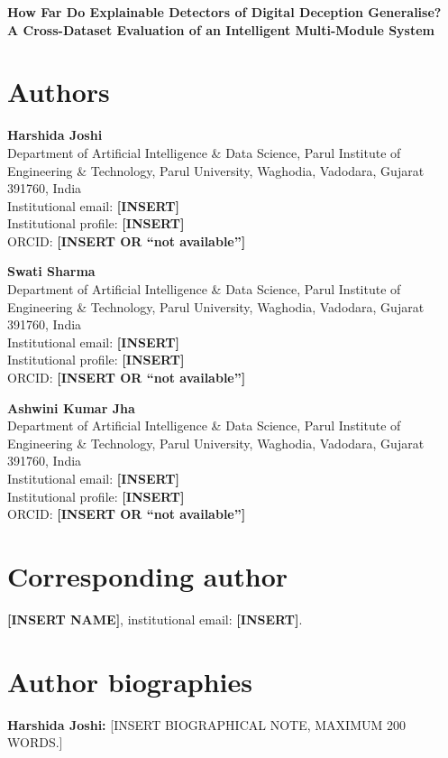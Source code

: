 \documentclass[11pt,a4paper]{article}
\begin{document}
\begin{center}
{\Large\bfseries How Far Do Explainable Detectors of Digital Deception Generalise?\\
A Cross-Dataset Evaluation of an Intelligent Multi-Module System\par}
\end{center}

\section*{Authors}

\textbf{Harshida Joshi}\\
Department of Artificial Intelligence \& Data Science, Parul Institute of Engineering \& Technology, Parul University, Waghodia, Vadodara, Gujarat 391760, India\\
Institutional email: \textbf{[INSERT]}\\
Institutional profile: \textbf{[INSERT]}\\
ORCID: \textbf{[INSERT OR ``not available'']}

\textbf{Swati Sharma}\\
Department of Artificial Intelligence \& Data Science, Parul Institute of Engineering \& Technology, Parul University, Waghodia, Vadodara, Gujarat 391760, India\\
Institutional email: \textbf{[INSERT]}\\
Institutional profile: \textbf{[INSERT]}\\
ORCID: \textbf{[INSERT OR ``not available'']}

\textbf{Ashwini Kumar Jha}\\
Department of Artificial Intelligence \& Data Science, Parul Institute of Engineering \& Technology, Parul University, Waghodia, Vadodara, Gujarat 391760, India\\
Institutional email: \textbf{[INSERT]}\\
Institutional profile: \textbf{[INSERT]}\\
ORCID: \textbf{[INSERT OR ``not available'']}

\section*{Corresponding author}
\textbf{[INSERT NAME]}, institutional email: \textbf{[INSERT]}.

\section*{Author biographies}
\textbf{Harshida Joshi:} [INSERT BIOGRAPHICAL NOTE, MAXIMUM 200 WORDS.]
\end{document}
